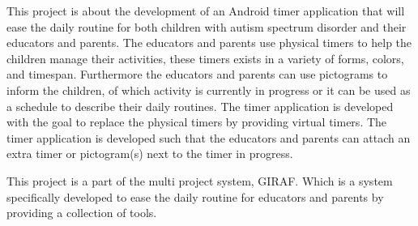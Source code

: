 \vspace{0.3cm}
This project is about the development of an Android timer application that will ease the daily routine for both children with autism spectrum disorder and their educators and parents. The educators and parents use physical timers to help the children manage their activities, these timers exists in a variety of forms, colors, and timespan. Furthermore the educators and parents can use pictograms to inform the children, of which activity is currently in progress or it can be used as a schedule to describe their daily routines. The timer application is developed with the goal to replace the physical timers by providing virtual timers. The timer application is developed such that the educators and parents can attach an extra timer or pictogram(s) next to the timer in progress.

This project is a part of the multi project system, GIRAF. Which is a system specifically developed to ease the daily routine for educators and parents by providing a collection of tools.
